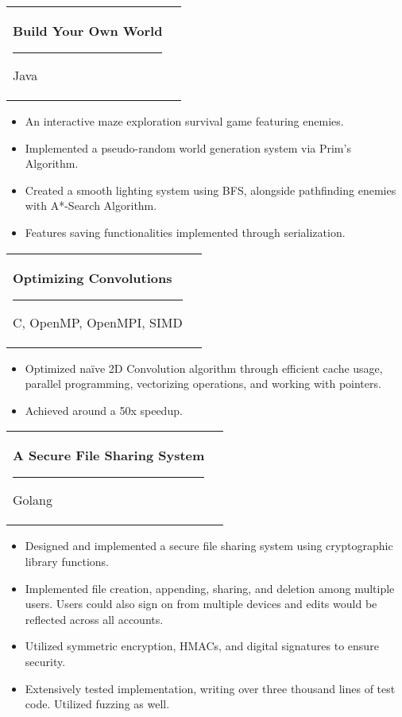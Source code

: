 \documentclass[letterpaper,11pt]{article}
\makeatletter
\newcommand{\resumeItemTwo}[1]{
	\item\small{
		#1 \vspace{-2pt}}
}
\newcommand{\resumeSubheadingTwo}[2]{
	\vspace{-1pt}\item
	\begin{tabular*}{0.97\textwidth}[t]{l@{\extracolsep{\fill}}r}
		\textbf{#1} \rule[-0.4ex]{0.1ex}{1.2em} #2 \\
	\end{tabular*}\vspace{-5pt}
}
\newcommand{\resumeItemListStart}{\begin{itemize}}
\newcommand{\resumeItemListEnd}{\end{itemize}\vspace{-5pt}}
\makeatother
\begin{document}
	\resumeSubheadingTwo
	{Build Your Own World}{Java}
	\resumeItemListStart
	\resumeItemTwo{An interactive maze exploration survival game featuring enemies.}
	\resumeItemTwo{Implemented a pseudo-random world generation system via Prim's Algorithm.}
	\resumeItemTwo{Created a smooth lighting system using BFS, alongside pathfinding enemies with A*-Search Algorithm.}
	\resumeItemTwo{Features saving functionalities implemented through serialization.}
	\resumeItemListEnd
	
	\resumeSubheadingTwo
	{Optimizing Convolutions}{C, OpenMP, OpenMPI, SIMD}
	\resumeItemListStart
	\resumeItemTwo{Optimized na\"ive 2D Convolution algorithm through efficient cache usage, parallel programming, vectorizing operations, and working with pointers.}
	\resumeItemTwo{Achieved around a 50x speedup.}
	\resumeItemListEnd
	
	\resumeSubheadingTwo
	{A Secure File Sharing System}{Golang}
	\resumeItemListStart
	\resumeItemTwo{Designed and implemented a secure file sharing system using cryptographic library functions.}
	\resumeItemTwo{Implemented file creation, appending, sharing, and deletion among multiple users. Users could also sign on from multiple devices and edits would be reflected across all accounts.}
	\resumeItemTwo{Utilized symmetric encryption, HMACs, and digital signatures to ensure security.}
	\resumeItemTwo{Extensively tested implementation, writing over three thousand lines of test code. Utilized fuzzing as well.}
	\resumeItemListEnd
	
	
\end{document}
